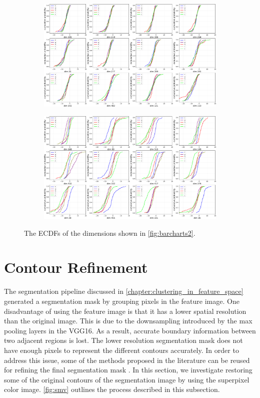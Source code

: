 \begin{figure}[t]
    \centering
    \begin{subfigure}{\textwidth}
        \centering
        \includegraphics[width=.85\linewidth]{figures/ECDFs_similar2.pdf}
    \vspace{5mm}
    \end{subfigure}
    \begin{subfigure}{\textwidth}
        \centering
        \includegraphics[width=.85\linewidth]{figures/ECDFs_dissimilar2.pdf}
    \end{subfigure}
    \caption{The ECDFs of the dimensions shown in \autoref{fig:barcharts2}.}
    \label{fig:ecdfs2}
\end{figure}

\clearpage
\chapter{Contour Refinement}\label{chapter:contour_refinement}

The segmentation pipeline discussed in \autoref{chapter:clustering_in_feature_space} generated a segmentation mask by grouping pixels in the feature image. One disadvantage of using the feature image is that it has a lower spatial resolution than the original image. This is due to the downsampling introduced by the max pooling layers in the VGG16. As a result, accurate boundary information between two adjacent regions is lost. The lower resolution segmentation mask does not have enough pixels to represent the different contours accurately. In order to address this issue, some of the methods proposed in the literature can be reused for refining the final segmentation mask \parencite{ma2018fully}. In this section, we investigate restoring some of the original contours of the segmentation image by using the superpixel color image. \autoref{fig:smv} outlines the process described in this subsection.

